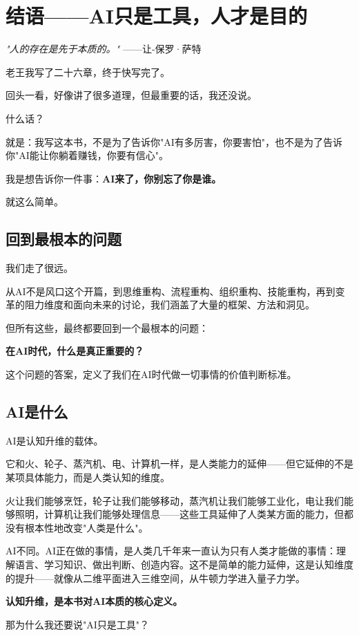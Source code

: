\chapter{结语——AI只是工具，人才是目的}


\textit{"人的存在是先于本质的。"}
——让-保罗·萨特


老王我写了二十六章，终于快写完了。

回头一看，好像讲了很多道理，但最重要的话，我还没说。

什么话？

就是：我写这本书，不是为了告诉你"AI有多厉害，你要害怕"，也不是为了告诉你"AI能让你躺着赚钱，你要有信心"。

我是想告诉你一件事：\textbf{AI来了，你别忘了你是谁。}

就这么简单。

\section{回到最根本的问题}


我们走了很远。

从AI不是风口这个开篇，到思维重构、流程重构、组织重构、技能重构，再到变革的阻力维度和面向未来的讨论，我们涵盖了大量的框架、方法和洞见。

但所有这些，最终都要回到一个最根本的问题：

\textbf{在AI时代，什么是真正重要的？}

这个问题的答案，定义了我们在AI时代做一切事情的价值判断标准。

\section{AI是什么}


AI是认知升维的载体。

它和火、轮子、蒸汽机、电、计算机一样，是人类能力的延伸——但它延伸的不是某项具体能力，而是人类认知的维度。

火让我们能够烹饪，轮子让我们能够移动，蒸汽机让我们能够工业化，电让我们能够照明，计算机让我们能够处理信息——这些工具延伸了人类某方面的能力，但都没有根本性地改变"人类是什么"。

AI不同。AI正在做的事情，是人类几千年来一直认为只有人类才能做的事情：理解语言、学习知识、做出判断、创造内容。这不是简单的能力延伸，这是认知维度的提升——就像从二维平面进入三维空间，从牛顿力学进入量子力学。

\textbf{认知升维，是本书对AI本质的核心定义。}

那为什么我还要说"AI只是工具"？

